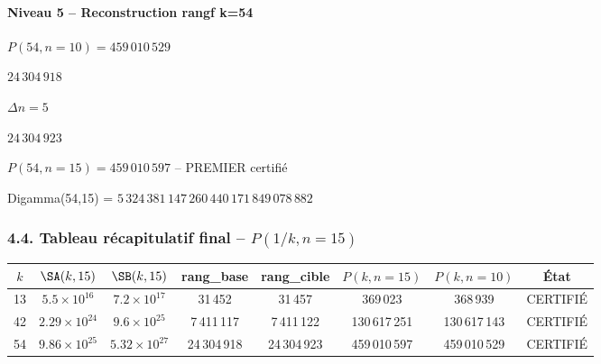 \vspace{0.3cm}

\paragraph{Niveau 5 -- Reconstruction rangf k=54}

\begin{boitealgo}[Reconstruction rangf -- k=54]
\begin{description}[nosep]
  \item[Ancrage] $P(54, n=10) = 459\,010\,529$
  \item[Rang de base] $24\,304\,918$
  \item[Écart] $\Delta n = 5$
  \item[Rang cible] $24\,304\,923$
  \item[Résultat] $P(54, n=15) = 459\,010\,597$ -- \textcolor{vert}{PREMIER certifié}
\end{description}
\end{boitealgo}

Digamma(54,15) = $5\,324\,381\,147\,260\,440\,171\,849\,078\,882$

\vspace{0.5cm}


\subsubsection*{4.4. Tableau récapitulatif final -- $P(1/k, n = 15)$}

\begin{center}
\small
\begin{tabular}{@{}cccccccc@{}}
\toprule
\rowcolor{spectralgris}
$k$ & $\SA(k, 15)$ & $\SB(k, 15)$ & rang\_base & rang\_cible & $P(k, n=15)$ & $P(k, n=10)$ & \textbf{État} \\
\midrule
13 & $5.5 \times 10^{16}$ & $7.2 \times 10^{17}$ & 31\,452 & 31\,457 & 369\,023 & 368\,939 & \textcolor{vert}{CERTIFIÉ} \\
42 & $2.29 \times 10^{24}$ & $9.6 \times 10^{25}$ & 7\,411\,117 & 7\,411\,122 & 130\,617\,251 & 130\,617\,143 & \textcolor{vert}{CERTIFIÉ} \\
54 & $9.86 \times 10^{25}$ & $5.32 \times 10^{27}$ & 24\,304\,918 & 24\,304\,923 & 459\,010\,597 & 459\,010\,529 & \textcolor{vert}{CERTIFIÉ} \\
\bottomrule
\end{tabular}
\end{center}

